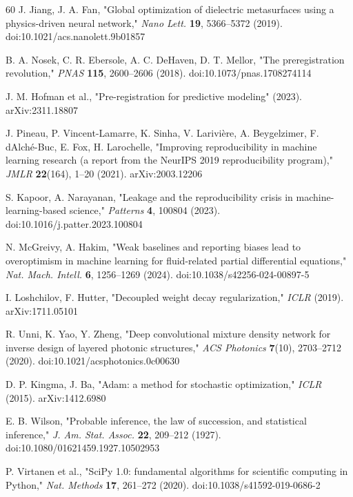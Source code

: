 \documentclass[11pt,a4paper]{article}
\begin{document}
\begin{thebibliography}{60}
J. Jiang, J. A. Fan, "Global optimization of dielectric metasurfaces using a physics-driven neural network," \emph{Nano Lett.} \textbf{19}, 5366--5372 (2019). doi:10.1021/acs.nanolett.9b01857

B. A. Nosek, C. R. Ebersole, A. C. DeHaven, D. T. Mellor, "The preregistration revolution," \emph{PNAS} \textbf{115}, 2600--2606 (2018). doi:10.1073/pnas.1708274114

J. M. Hofman et al., "Pre-registration for predictive modeling" (2023). arXiv:2311.18807

J. Pineau, P. Vincent-Lamarre, K. Sinha, V. Larivière, A. Beygelzimer, F. d\textquotesingle Alché-Buc, E. Fox, H. Larochelle, "Improving reproducibility in machine learning research (a report from the NeurIPS 2019 reproducibility program)," \emph{JMLR} \textbf{22}(164), 1--20 (2021). arXiv:2003.12206

S. Kapoor, A. Narayanan, "Leakage and the reproducibility crisis in machine-learning-based science," \emph{Patterns} \textbf{4}, 100804 (2023). doi:10.1016/j.patter.2023.100804

N. McGreivy, A. Hakim, "Weak baselines and reporting biases lead to overoptimism in machine learning for fluid-related partial differential equations," \emph{Nat. Mach. Intell.} \textbf{6}, 1256--1269 (2024). doi:10.1038/s42256-024-00897-5

I. Loshchilov, F. Hutter, "Decoupled weight decay regularization," \emph{ICLR} (2019). arXiv:1711.05101

R. Unni, K. Yao, Y. Zheng, "Deep convolutional mixture density network for inverse design of layered photonic structures," \emph{ACS Photonics} \textbf{7}(10), 2703--2712 (2020). doi:10.1021/acsphotonics.0c00630

D. P. Kingma, J. Ba, "Adam: a method for stochastic optimization," \emph{ICLR} (2015). arXiv:1412.6980

E. B. Wilson, "Probable inference, the law of succession, and statistical inference," \emph{J. Am. Stat. Assoc.} \textbf{22}, 209--212 (1927). doi:10.1080/01621459.1927.10502953

P. Virtanen et al., "SciPy 1.0: fundamental algorithms for scientific computing in Python," \emph{Nat. Methods} \textbf{17}, 261--272 (2020). doi:10.1038/s41592-019-0686-2


\end{thebibliography}
\end{document}

